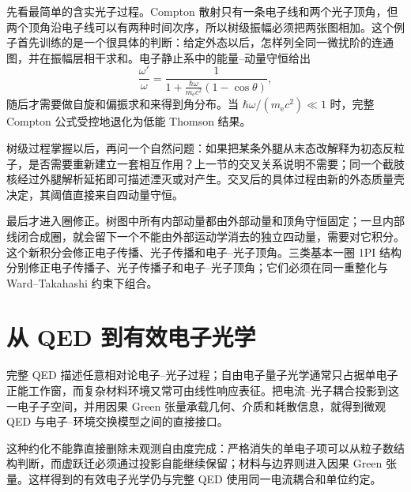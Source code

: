 先看最简单的含实光子过程。Compton 散射只有一条电子线和两个光子顶角，但两个顶角沿电子线可以有两种时间次序，所以树级振幅必须把两张图相加。这个例子首先训练的是一个很具体的判断：给定外态以后，怎样列全同一微扰阶的连通图，并在振幅层相干求和。电子静止系中的能量--动量守恒给出
\[
 \frac{\omega'}{\omega}
 =\frac{1}{1+\frac{\hbar\omega}{m_{\mathrm e} c^2}(1-\cos\theta)},
\]
随后才需要做自旋和偏振求和来得到角分布。当 $\hbar\omega/(m_{\mathrm e} c^2)\ll1$ 时，完整 Compton 公式受控地退化为低能 Thomson 结果。

树级过程掌握以后，再问一个自然问题：如果把某条外腿从末态改解释为初态反粒子，是否需要重新建立一套相互作用？上一节的交叉关系说明不需要；同一个截肢核经过外腿解析延拓即可描述湮灭或对产生。交叉后的具体过程由新的外态质量壳决定，其阈值直接来自四动量守恒。

最后才进入圈修正。树图中所有内部动量都由外部动量和顶角守恒固定；一旦内部线闭合成圈，就会留下一个不能由外部运动学消去的独立四动量，需要对它积分。这个新积分会修正电子传播、光子传播和电子--光子顶角。三类基本一圈 1PI 结构分别修正电子传播子、光子传播子和电子--光子顶角；它们必须在同一重整化与 Ward--Takahashi 约束下组合。
















\section{从 QED 到有效电子光学}

完整 QED 描述任意相对论电子--光子过程；自由电子量子光学通常只占据单电子正能工作窗，而复杂材料环境又常可由线性响应表征。把电流--光子耦合投影到这一电子子空间，并用因果 Green 张量承载几何、介质和耗散信息，就得到微观 QED 与电子--环境交换模型之间的直接接口。

这种约化不能靠直接删除未观测自由度完成：严格消失的单电子项可以从粒子数结构判断，而虚跃迁必须通过投影自能继续保留；材料与边界则进入因果 Green 张量。这样得到的有效电子光学仍与完整 QED 使用同一电流耦合和单位约定。

